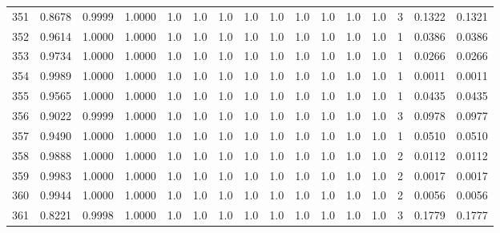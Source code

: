 \begin{tabular}{lrrrrrrrrrrrrrrr}
351 &      0.8678 &  0.9999 &  1.0000 &     1.0 &     1.0 &     1.0 &     1.0 &     1.0 &     1.0 &     1.0 &      1.0 &        1.0 &      3 &                    0.1322 &                     0.1321 \\
352 &      0.9614 &  1.0000 &  1.0000 &     1.0 &     1.0 &     1.0 &     1.0 &     1.0 &     1.0 &     1.0 &      1.0 &        1.0 &      1 &                    0.0386 &                     0.0386 \\
353 &      0.9734 &  1.0000 &  1.0000 &     1.0 &     1.0 &     1.0 &     1.0 &     1.0 &     1.0 &     1.0 &      1.0 &        1.0 &      1 &                    0.0266 &                     0.0266 \\
354 &      0.9989 &  1.0000 &  1.0000 &     1.0 &     1.0 &     1.0 &     1.0 &     1.0 &     1.0 &     1.0 &      1.0 &        1.0 &      1 &                    0.0011 &                     0.0011 \\
355 &      0.9565 &  1.0000 &  1.0000 &     1.0 &     1.0 &     1.0 &     1.0 &     1.0 &     1.0 &     1.0 &      1.0 &        1.0 &      1 &                    0.0435 &                     0.0435 \\
356 &      0.9022 &  0.9999 &  1.0000 &     1.0 &     1.0 &     1.0 &     1.0 &     1.0 &     1.0 &     1.0 &      1.0 &        1.0 &      3 &                    0.0978 &                     0.0977 \\
357 &      0.9490 &  1.0000 &  1.0000 &     1.0 &     1.0 &     1.0 &     1.0 &     1.0 &     1.0 &     1.0 &      1.0 &        1.0 &      1 &                    0.0510 &                     0.0510 \\
358 &      0.9888 &  1.0000 &  1.0000 &     1.0 &     1.0 &     1.0 &     1.0 &     1.0 &     1.0 &     1.0 &      1.0 &        1.0 &      2 &                    0.0112 &                     0.0112 \\
359 &      0.9983 &  1.0000 &  1.0000 &     1.0 &     1.0 &     1.0 &     1.0 &     1.0 &     1.0 &     1.0 &      1.0 &        1.0 &      2 &                    0.0017 &                     0.0017 \\
360 &      0.9944 &  1.0000 &  1.0000 &     1.0 &     1.0 &     1.0 &     1.0 &     1.0 &     1.0 &     1.0 &      1.0 &        1.0 &      2 &                    0.0056 &                     0.0056 \\
361 &      0.8221 &  0.9998 &  1.0000 &     1.0 &     1.0 &     1.0 &     1.0 &     1.0 &     1.0 &     1.0 &      1.0 &        1.0 &      3 &                    0.1779 &                     0.1777 \\

\end{tabular}
